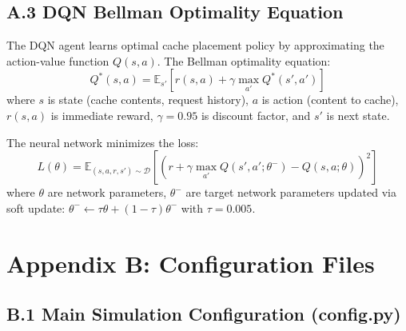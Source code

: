\documentclass[12pt,a4paper]{article}
\begin{document}
\subsection*{A.3 DQN Bellman Optimality Equation}

The DQN agent learns optimal cache placement policy by approximating the action-value function $Q(s, a)$. The Bellman optimality equation:
\begin{equation}
Q^*(s, a) = \mathbb{E}_{s'}\left[r(s, a) + \gamma \max_{a'} Q^*(s', a')\right]
\end{equation}
where $s$ is state (cache contents, request history), $a$ is action (content to cache), $r(s,a)$ is immediate reward, $\gamma = 0.95$ is discount factor, and $s'$ is next state.

The neural network minimizes the loss:
\begin{equation}
L(\theta) = \mathbb{E}_{(s,a,r,s') \sim \mathcal{D}}\left[\left(r + \gamma \max_{a'} Q(s', a'; \theta^-) - Q(s, a; \theta)\right)^2\right]
\end{equation}
where $\theta$ are network parameters, $\theta^-$ are target network parameters updated via soft update: $\theta^- \leftarrow \tau\theta + (1-\tau)\theta^-$ with $\tau = 0.005$.

\clearpage

\section*{Appendix B: Configuration Files}

\subsection*{B.1 Main Simulation Configuration (config.py)}
\end{document}
